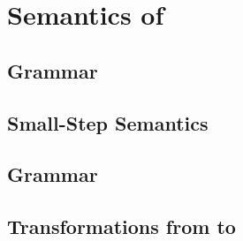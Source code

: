 \onecolumn
\appendix
\section{Semantics of \constc}
\label{sec:ottsemantics}

\subsection{\ccore Grammar}

\newpage
\subsection{\ccore Small-Step Semantics}
\ottdefnsJop

\newpage
\subsection{\constc Grammar}
\label{sec:constcgrammar}

\newpage
\subsection{Transformations from \constc to \ccore}
\label{sec:coretransform}
\ottdefnsJoptrans
\ottdefnsJtrans
